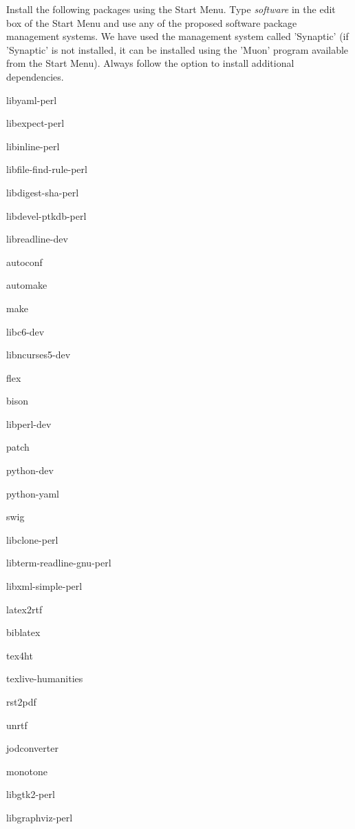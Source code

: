 \documentclass[12pt]{article}
\begin{document}
Install the following packages using the Start Menu.  Type
  {\it software} in the edit box of the Start Menu and use any of the
  proposed software package management systems.  We have used the
  management system called 'Synaptic' (if 'Synaptic' is not installed,
  it can be installed using the 'Muon' program available from the
  Start Menu).  Always follow the option to install additional
  dependencies.
      \begin{description}
         \item libyaml-perl
         \item libexpect-perl
         \item libinline-perl
         \item libfile-find-rule-perl
         \item libdigest-sha-perl
         \item libdevel-ptkdb-perl
         \item libreadline-dev
         \item autoconf
         \item automake
         \item make
         \item libc6-dev
         \item libncurses5-dev
         \item flex
         \item bison
         \item libperl-dev
         \item patch
         \item python-dev
         \item python-yaml
         \item swig
         \item libclone-perl
         \item libterm-readline-gnu-perl
         \item libxml-simple-perl
         \item latex2rtf
         \item biblatex
         \item tex4ht
         \item texlive-humanities
         \item rst2pdf
         \item unrtf
         \item jodconverter
         \item monotone
         \item libgtk2-perl
         \item libgraphviz-perl

\end{description}
\end{document}
